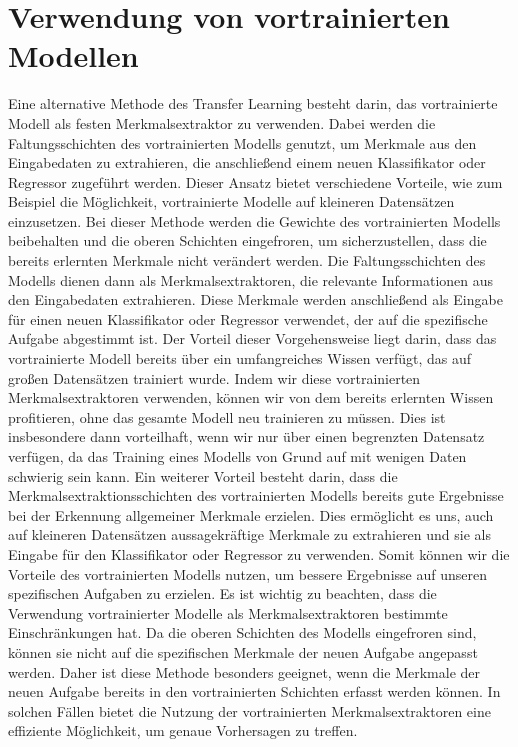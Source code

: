 \section{Verwendung von vortrainierten Modellen} %

    Eine alternative Methode des Transfer Learning besteht darin, das vortrainierte Modell als festen Merkmalsextraktor zu verwenden. 
    Dabei werden die Faltungsschichten des vortrainierten Modells genutzt, um Merkmale aus den Eingabedaten zu extrahieren, die anschließend einem neuen Klassifikator oder Regressor zugeführt werden. 
    Dieser Ansatz bietet verschiedene Vorteile, wie zum Beispiel die Möglichkeit, vortrainierte Modelle auf kleineren Datensätzen einzusetzen.
    Bei dieser Methode werden die Gewichte des vortrainierten Modells beibehalten und die oberen Schichten eingefroren, um sicherzustellen, dass die bereits erlernten Merkmale nicht verändert werden. 
    Die Faltungsschichten des Modells dienen dann als Merkmalsextraktoren, die relevante Informationen aus den Eingabedaten extrahieren. 
    Diese Merkmale werden anschließend als Eingabe für einen neuen Klassifikator oder Regressor verwendet, der auf die spezifische Aufgabe abgestimmt ist.
    Der Vorteil dieser Vorgehensweise liegt darin, dass das vortrainierte Modell bereits über ein umfangreiches Wissen verfügt, das auf großen Datensätzen trainiert wurde. 
    Indem wir diese vortrainierten Merkmalsextraktoren verwenden, können wir von dem bereits erlernten Wissen profitieren, ohne das gesamte Modell neu trainieren zu müssen. 
    Dies ist insbesondere dann vorteilhaft, wenn wir nur über einen begrenzten Datensatz verfügen, da das Training eines Modells von Grund auf mit wenigen Daten schwierig sein kann.
    Ein weiterer Vorteil besteht darin, dass die Merkmalsextraktionsschichten des vortrainierten Modells bereits gute Ergebnisse bei der Erkennung allgemeiner Merkmale erzielen. 
    Dies ermöglicht es uns, auch auf kleineren Datensätzen aussagekräftige Merkmale zu extrahieren und sie als Eingabe für den Klassifikator oder Regressor zu verwenden. 
    Somit können wir die Vorteile des vortrainierten Modells nutzen, um bessere Ergebnisse auf unseren spezifischen Aufgaben zu erzielen.
    Es ist wichtig zu beachten, dass die Verwendung vortrainierter Modelle als Merkmalsextraktoren bestimmte Einschränkungen hat. 
    Da die oberen Schichten des Modells eingefroren sind, können sie nicht auf die spezifischen Merkmale der neuen Aufgabe angepasst werden. 
    Daher ist diese Methode besonders geeignet, wenn die Merkmale der neuen Aufgabe bereits in den vortrainierten Schichten erfasst werden können. 
    In solchen Fällen bietet die Nutzung der vortrainierten Merkmalsextraktoren eine effiziente Möglichkeit, um genaue Vorhersagen zu treffen.

